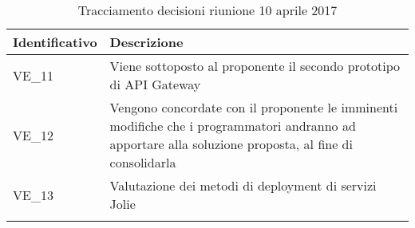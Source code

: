 \begin{longtable}{|>{\centering\arraybackslash}p{4cm}|>{\centering\arraybackslash}p{9cm}|}
	\hline \rowcolor{Gray}
	\textbf{Identificativo} & \textbf{Descrizione}\\
	\hline
	\endhead
			VE\_11	& Viene sottoposto al proponente il secondo prototipo di API Gateway \\
			\hline
			VE\_12 & Vengono concordate con il proponente le imminenti modifiche che i programmatori andranno ad apportare alla soluzione proposta, al fine di consolidarla \\
			\hline
			VE\_13 & Valutazione dei metodi di deployment di servizi Jolie\\
			\hline
		\caption{Tracciamento decisioni riunione 10 aprile 2017}
\end{longtable}